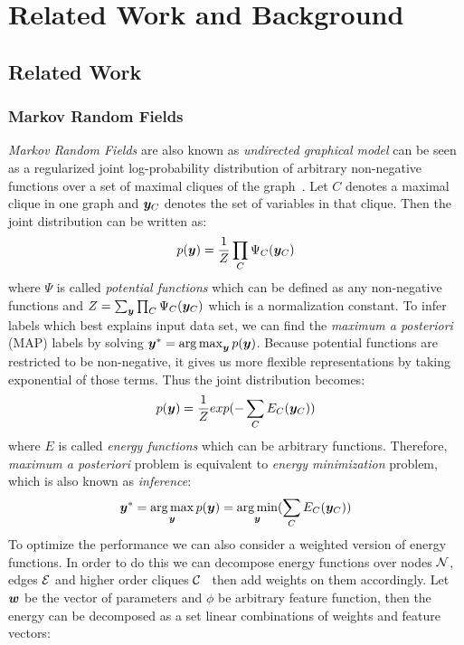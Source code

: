 
\chapter{Related Work and Background}
\label{cha:RelatedWorks}

\section{Related Work}
\subsection{Markov Random Fields}
\label{sec:MRF}
\emph{Markov Random Fields} are also known as \emph{undirected
  graphical model} can be seen as a regularized joint
log-probability distribution of arbitrary non-negative functions
over a set of maximal cliques of the
graph~\cite{bishop:2006:PRML}. Let $C$ denotes a maximal clique
in one graph and ${\bm{y}}_C$ denotes the set of variables in that
clique. Then the joint distribution can be written as:
\begin{align}
  p({\bm{y}})=\frac{1}{Z}\prod_{C}{\Psi_C({\bm{y}}_C)}
\end{align}
\noindent where $\Psi$ is called \emph{potential functions} which
can be defined as any non-negative functions and
$Z=\sum_{{\bm{y}}}\prod_{C}{\Psi_C({\bm{y}}_C)}$ which is a normalization
constant. To infer labels which best explains input data set, we
can find the \emph{maximum a posteriori} (MAP) labels by solving
${\bm{y}}^*=\operatorname*{arg\,max}_{{\bm{y}}}p({\bm{y}})$. Because potential functions are
restricted to be non-negative, it gives us more flexible
representations by taking exponential of those terms. Thus the
joint distribution becomes:
\begin{align}
  p({\bm{y}})=\frac{1}{Z}exp(-\sum_{C}{E_C({\bm{y}}_C)})
\end{align}
\noindent where $E$ is called \emph{energy functions} which can be
arbitrary functions. Therefore, \emph{maximum a posteriori}
problem is equivalent to \emph{energy minimization} problem,
which is also known as \emph{inference}:
\begin{align}
  {\bm{y}}^*=\operatorname*{arg\,max}_{{\bm{y}}}p({\bm{y}})=\operatorname*{arg\,min}_{{\bm{y}}}(\sum_{C}{E_C({\bm{y}}_C)})
\end{align}
To optimize the performance we can also consider a weighted
version of energy functions. In order to do this we can decompose
energy functions over nodes ${\mathcal{N}}$, edges ${\mathcal{E}}$ and higher order
cliques ${\mathcal{C}}$~\cite{Szummer:ECCV08} then add weights on them
accordingly. Let ${\bm{w}}$ be the vector of parameters and $\phi$ be
arbitrary feature function, then the energy can be decomposed as
a set linear combinations of weights and feature vectors:

